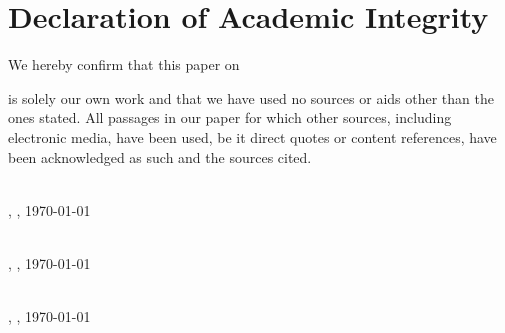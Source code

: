 \chapter*{Declaration of Academic Integrity}
We hereby confirm that this paper on
\begin{center}
\textit{\printtitle}
\end{center}
is solely our own work and that we have used no sources or aids other than the ones stated. All
passages in our paper for which other sources, including electronic media, have been used, be it
direct quotes or content references, have been acknowledged as such and the sources cited.


\vspace{0.75cm}
\parbox{17em}{\hrulefill} \\
\printnameHendrik, \printcity, \today

\vspace{0.75cm}
\parbox{17em}{\hrulefill} \\
\printnameMaxi, \printcity, \today

\vspace{0.75cm}
\parbox{17em}{\hrulefill} \\
\printnameTimo, \printcity, \today

